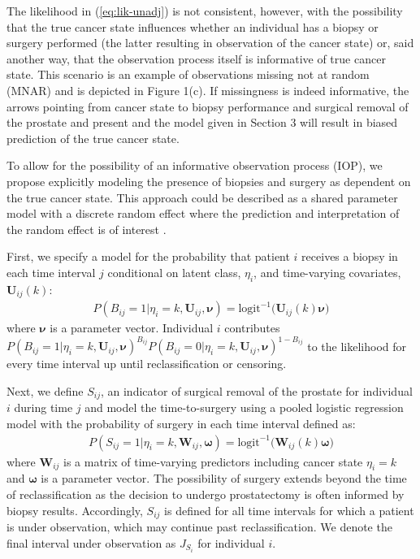 \documentclass[12pt, letterpaper]{article}
\newcommand{\bmnu}{\boldsymbol{\nu}}
\newcommand{\bmomega}{\boldsymbol{\omega}}
\newcommand{\bmW}{\mathbf{W}}
\newcommand{\bmU}{\mathbf{U}}
\newcommand{\bea}{\begin{eqnarray}}
\newcommand{\eea}{\end{eqnarray}}
\newcommand{\beas}{\begin{eqnarray*}}
\newcommand{\eeas}{\end{eqnarray*}}
\begin{document}
The likelihood in (\ref{eq:lik-unadj}) is not consistent, however, with the possibility that the true cancer state influences whether an individual has a biopsy or surgery performed (the latter resulting in observation of the cancer state) or, said another way, that the observation process itself is informative of true cancer state. This scenario is an example of observations missing not at random (MNAR) and is depicted in Figure 1(c). If missingness is indeed informative, the arrows pointing from cancer state to biopsy performance and surgical removal of the prostate and present and the model given in Section 3 will result in biased prediction of the true cancer state. 

To allow for the possibility of an informative observation process (IOP), we propose explicitly modeling the presence of biopsies and surgery as dependent on the true cancer state. This approach could be described as a shared parameter model with a discrete random effect where the prediction and interpretation of the random effect is of interest \cite{Follmann1995}. 

First, we specify a model for the probability that patient $i$ receives a biopsy in each time interval $j$ conditional on latent class, $\eta_i$, and time-varying covariates, $\bmU_{ij}(k)$:  
\bea
\label{eq:p_bx}
P(B_{ij}=1 | \eta_i=k, \bmU_{ij}, \bmnu) = \text{logit}^{-1}\big( \bmU_{ij}(k) \bmnu \big)
\eea
where $\bmnu$ is a parameter vector. Individual $i$ contributes $P(B_{ij}=1 | \eta_i=k, \bmU_{ij}, \bmnu)^{B_{ij}}P(B_{ij}=0 | \eta_i=k, \bmU_{ij}, \bmnu)^{1-B_{ij}}$ to the likelihood for every time interval up until reclassification or censoring.

Next, we define $S_{ij}$, an indicator of surgical removal of the prostate for individual $i$ during time $j$ and model the time-to-surgery using a pooled logistic regression model with the probability of surgery in each time interval defined as:
\beas
P(S_{ij}=1 | \eta_i=k, \bmW_{ij}, \bmomega) = \text{logit}^{-1}\big( \bmW_{ij}(k)\bmomega \big)
\eeas
where $\bmW_{ij}$ is a matrix of time-varying predictors including cancer state $\eta_i=k$ and $\bmomega$ is a parameter vector. The possibility of surgery extends beyond the time of reclassification as the decision to undergo prostatectomy is often informed by biopsy results. Accordingly, $S_{ij}$ is defined for all time intervals for which a patient is under observation, which may continue past reclassification. We denote the final interval under observation as $J_{S_i}$ for individual $i$.
\end{document}
